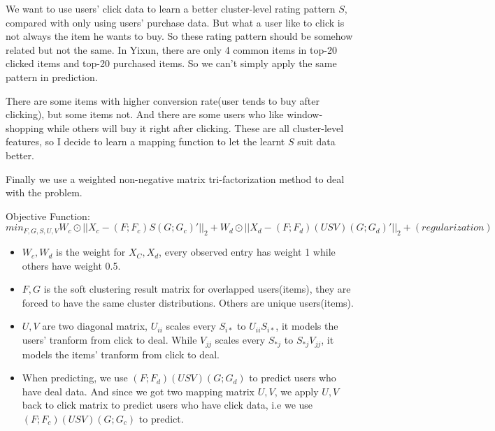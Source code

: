   \par{We want to use users' click data to learn a better cluster-level rating pattern $S$, compared with only using users' purchase data. But what a user like to click is not always the item he wants to buy. So these rating pattern should be somehow related but not the same. In Yixun, there are only 4 common items in top-20 clicked items and top-20 purchased items. So we can't simply apply the same pattern in prediction.}

\par{There are some items with higher conversion rate(user tends to buy after clicking), but some items not. And there are some users who like window-shopping while others will buy it right after clicking. These are all cluster-level features, so I decide to learn a mapping function to let the learnt $S$ suit data better.}

\par{Finally we use a weighted non-negative matrix tri-factorization method to deal with the problem.  }
 
  \par{Objective Function:$$min_{F,G,S,U,V} W_c\odot ||X_c - (F;F_c)S(G;G_c)'||_2 + W_d\odot ||X_d - (F;F_d)(USV)(G;G_d)'||_2 + (regularization)$$}

  \par{
    \begin{itemize}
    \item $W_c,W_d$ is the weight for $X_C, X_d$, every observed entry has weight 1 while others have weight 0.5.
    \item $F, G$ is the soft clustering result matrix for overlapped users(items), they are forced to have the same cluster distributions. Others are unique users(items).
    \item $U,V$ are two diagonal matrix, $U_{ii}$ scales every $S_{i*}$ to $U_{ii}S_{i*}$, it models the users' tranform from click to deal. While $V_{jj}$ scales every $S_{*j}$ to $S_{*j}V_{jj}$, it models the items' tranform from click to deal.
    \item When predicting, we use $(F;F_d)(USV)(G;G_d)$ to predict users who have deal data. And since we got two mapping matrix $U,V$, we apply $U,V$ back to click matrix to predict users who have click data, i.e we use $(F;F_c)(USV)(G;G_c)$ to predict.
    \end{itemize}
}



